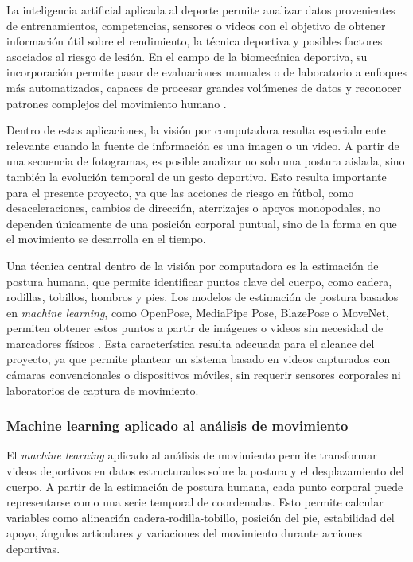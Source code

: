 La inteligencia artificial aplicada al deporte permite analizar datos provenientes de
entrenamientos, competencias, sensores o videos con el objetivo de obtener información útil
sobre el rendimiento, la técnica deportiva y posibles factores asociados al riesgo de lesión.
En el campo de la biomecánica deportiva, su incorporación permite pasar de evaluaciones
manuales o de laboratorio a enfoques más automatizados, capaces de procesar grandes volúmenes
de datos y reconocer patrones complejos del movimiento humano \parencite{SouaifiEtAl2025}.

Dentro de estas aplicaciones, la visión por computadora resulta especialmente relevante cuando
la fuente de información es una imagen o un video. A partir de una secuencia de fotogramas, es
posible analizar no solo una postura aislada, sino también la evolución temporal de un gesto
deportivo. Esto resulta importante para el presente proyecto, ya que las acciones de riesgo en
fútbol, como desaceleraciones, cambios de dirección, aterrizajes o apoyos monopodales, no
dependen únicamente de una posición corporal puntual, sino de la forma en que el movimiento se
desarrolla en el tiempo.

Una técnica central dentro de la visión por computadora es la estimación de postura humana, que
permite identificar puntos clave del cuerpo, como cadera, rodillas, tobillos, hombros y pies.
Los modelos de estimación de postura basados en \textit{machine learning}, como OpenPose,
MediaPipe Pose, BlazePose o MoveNet, permiten obtener estos puntos a partir de imágenes o videos
sin necesidad de marcadores físicos \parencite{RoggioEtAl2024}. Esta característica resulta
adecuada para el alcance del proyecto, ya que permite plantear un sistema basado en videos
capturados con cámaras convencionales o dispositivos móviles, sin requerir sensores corporales
ni laboratorios de captura de movimiento.

\subsubsection{Machine learning aplicado al análisis de movimiento}

El \textit{machine learning} aplicado al análisis de movimiento permite transformar videos
deportivos en datos estructurados sobre la postura y el desplazamiento del cuerpo. A partir de
la estimación de postura humana, cada punto corporal puede representarse como una serie temporal
de coordenadas. Esto permite calcular variables como alineación cadera-rodilla-tobillo, posición
del pie, estabilidad del apoyo, ángulos articulares y variaciones del movimiento durante
acciones deportivas.

